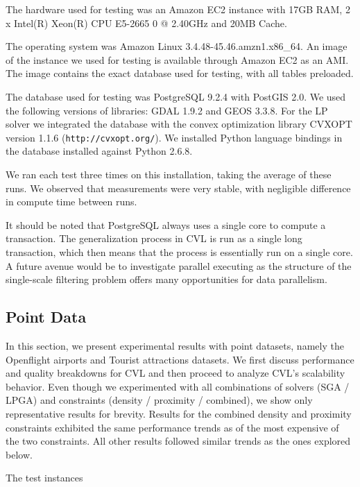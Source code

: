The hardware used for testing was an Amazon EC2 instance with 17GB RAM, 2 x Intel(R) Xeon(R) CPU E5-2665 0 @ 2.40GHz and 20MB Cache. 

The operating system was Amazon Linux 3.4.48-45.46.amzn1.x86\_64. An image of the instance we used for testing is available through Amazon EC2 as an AMI. The image contains the exact database used for testing, with all tables preloaded.

The database used for testing was PostgreSQL 9.2.4 with PostGIS  2.0. We used the following versions of libraries: GDAL 1.9.2 and GEOS 3.3.8. For the LP solver we integrated the database with the convex optimization library CVXOPT version 1.1.6 (\texttt{http://cvxopt.org/}). We installed Python language bindings in the database installed against Python 2.6.8.

We ran each test three times on this installation, taking the average of these runs. We observed that measurements were very stable, with negligible difference in compute time between runs.

It should be noted that PostgreSQL always uses a single core to compute a transaction. The generalization process in CVL is run as a single long transaction, which then means that the process is essentially run on a single core. A future avenue would be to investigate parallel executing as the structure of the single-scale filtering problem offers many opportunities for data parallelism.

\subsection{Point Data}
\label{sec:exp:points}

In this section, we present experimental results with point datasets, namely the Openflight airports and Tourist attractions datasets. We first discuss performance and quality breakdowns for CVL and then proceed to analyze CVL's scalability behavior. Even though we experimented with all combinations of solvers (SGA / LPGA) and constraints (density / proximity / combined), we show only representative results for brevity. Results for the combined density and proximity constraints exhibited the same performance trends as of the most expensive of the two constraints. All other results followed similar trends as the ones explored below.    

The test instances


